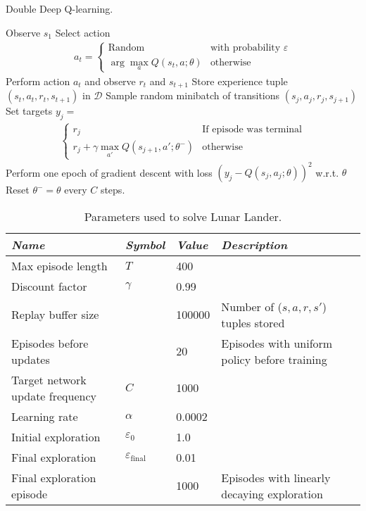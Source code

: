 \documentclass{article}
\begin{document}
\begin{algorithm}[tb]
   \caption{Double Deep Q-learning.}
   \label{alg:ddqn}
\begin{algorithmic}[1]
    \STATE Observe $s_1$
      \STATE Select action
      \begin{align*}
        a_t = \begin{cases}
          \text{Random} & \text{with probability } \varepsilon \\
          \arg \max_a Q(s_t, a; \theta) & \text{otherwise}
        \end{cases}
      \end{align*}
      \STATE Perform action $a_t$ and observe $r_t$ and $s_{t+1}$
      \STATE Store experience tuple $(s_{t}, a_{t}, r_{t}, s_{t+1})$ in $\mathcal{D}$
      \STATE Sample random minibatch of transitions $(s_j, a_j, r_j, s_{j+1})$
      \STATE Set targets $y_j = $
      \begin{align*}
        \begin{cases}
          r_j & \text{If episode was terminal} \\
          r_j + \gamma \max_{a'} Q(s_{j+1}, a'; \theta^{-}) & \text{otherwise}
        \end{cases}
      \end{align*}
      \STATE Perform one epoch of gradient descent with loss $(y_j - Q(s_j, a_j; \theta))^2$ w.r.t. $\theta$
      \STATE Reset $\theta^{-} = \theta$ every $C$ steps.
    \ENDFOR
  \ENDFOR
\end{algorithmic}
\end{algorithm}

\begin{table*}
  \centering
  \caption{Parameters used to solve Lunar Lander.}
  \label{tbl:params}
\begin{tabular}{*4l} \toprule
\emph{Name}       & \emph{Symbol} & \emph{Value} & \emph{Description} \\ \midrule
Max episode length                 & $T$ & 400 & \\
Discount factor & $\gamma$ & 0.99   & \\
Replay buffer size & & 100000 & Number of ($s,a,r,s'$) tuples stored \\
Episodes before updates & & 20 & Episodes with uniform policy before training \\
Target network update frequency & $C$ & 1000 & \\
Learning rate & $\alpha$ & 0.0002 & \\
Initial exploration & $\varepsilon_0$ & 1.0 & \\
Final exploration & $\varepsilon_{\text{final}}$ & 0.01 & \\
Final exploration episode & & 1000 & Episodes with linearly decaying exploration \\ \bottomrule
\end{tabular}
\end{table*}
\end{document}
